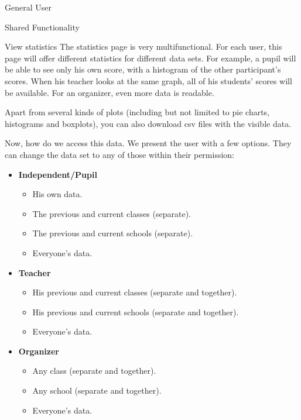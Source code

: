 \begin{section}{General User}
\begin{subsection}{Shared Functionality}
        \begin{subsubsection}{View statistics}
            The statistics page is very multifunctional. For each user, this
            page will offer different statistics for different data sets. For
            example, a pupil will be able to see only his own score, with a
            histogram of the other participant's scores. When his teacher looks
            at the same graph, all of his students' scores will be available.
            For an organizer, even more data is readable.

            Apart from several kinds of plots (including but not limited to pie
            charts, histograms and boxplots), you can also download csv files
            with the visible data.

            Now, how do we access this data. We present the user with a few
            options. They can change the data set to any of those within their
            permission:

            \begin{itemize}
                \item \textbf{Independent/Pupil}
                    \begin{itemize}
                        \item His own data.
                        \item The previous and current classes (separate).
                        \item The previous and current schools (separate).
                        \item Everyone's data.
                    \end{itemize}
                \item \textbf{Teacher}
                    \begin{itemize}
                        \item His previous and current classes (separate and
                            together).
                        \item His previous and current schools (separate and
                            together).
                        \item Everyone's data.
                    \end{itemize}
                \item \textbf{Organizer}
                    \begin{itemize}
                        \item Any class (separate and together).
                        \item Any school (separate and together).
                        \item Everyone's data.
                    \end{itemize}
            \end{itemize}


\end{subsubsection}
\end{subsection}
\end{section}
